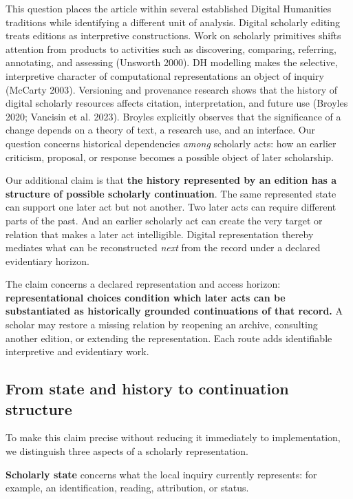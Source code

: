 \documentclass[11pt,a4paper]{article}
\begin{document}
This question places the article within several established Digital Humanities traditions while identifying a different unit of analysis. Digital scholarly editing treats editions as interpretive constructions. Work on scholarly primitives shifts attention from products to activities such as discovering, comparing, referring, annotating, and assessing (Unsworth 2000). DH modelling makes the selective, interpretive character of computational representations an object of inquiry (McCarty 2003). Versioning and provenance research shows that the history of digital scholarly resources affects citation, interpretation, and future use (Broyles 2020; Vancisin et al. 2023). Broyles explicitly observes that the significance of a change depends on a theory of text, a research use, and an interface. Our question concerns historical dependencies \emph{among} scholarly acts: how an earlier criticism, proposal, or response becomes a possible object of later scholarship.


Our additional claim is that \textbf{the history represented by an edition has a structure of possible scholarly continuation}. The same represented state can support one later act but not another. Two later acts can require different parts of the past. And an earlier scholarly act can create the very target or relation that makes a later act intelligible. Digital representation thereby mediates what can be reconstructed \emph{next} from the record under a declared evidentiary horizon.


The claim concerns a declared representation and access horizon: \textbf{representational choices condition which later acts can be substantiated as historically grounded continuations of that record.} A scholar may restore a missing relation by reopening an archive, consulting another edition, or extending the representation. Each route adds identifiable interpretive and evidentiary work.


\subsection{From state and history to continuation structure}

To make this claim precise without reducing it immediately to implementation, we distinguish three aspects of a scholarly representation.


\textbf{Scholarly state} concerns what the local inquiry currently represents: for example, an identification, reading, attribution, or status.
\end{document}
